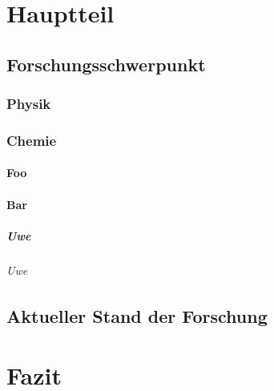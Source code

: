 \documentclass[ngerman,12pt]{scrreprt}
\begin{document}
\chapter{Hauptteil}

\section{Forschungsschwerpunkt}

\blindtext[5]

\subsection{Physik}

\blindtext[5]

\subsection{Chemie}

\blindtext[5]

\subsubsection{Foo}

\blindtext[5]

\subsubsection{Bar}

\blindtext[5]

\paragraph{Uwe} \blindtext

\subparagraph{Uwe} \blindtext

\section{Aktueller Stand der Forschung}

\blindtext[5]

\chapter{Fazit}

\blindtext[25]
\end{document}
